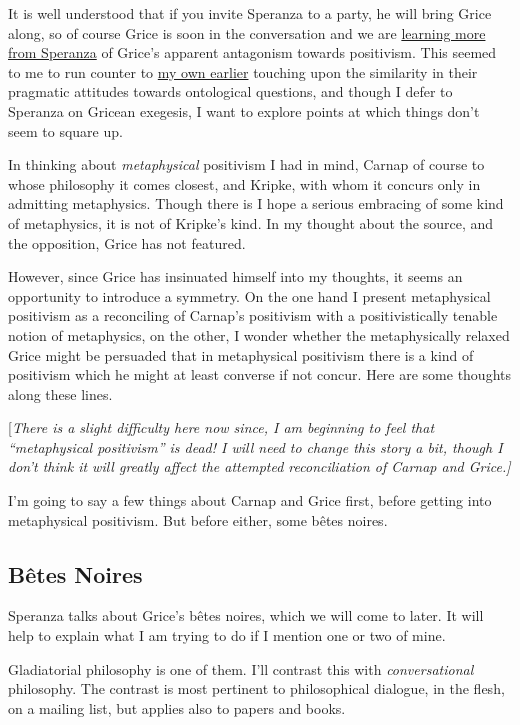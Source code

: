 \documentclass[10pt,titlepage]{book}
\begin{document}
It is well understood that if you invite Speranza to a party, he will bring Grice along, so of course Grice is soon in the conversation and we are \href{http://rbjones.com/pipermail/hist-analytic_rbjones.com/2009q2/000268.html}{learning more from Speranza} of Grice's apparent antagonism towards positivism.
This seemed to me to run counter to \href{http://rbjones.com/pipermail/hist-analytic_rbjones.com/2009q2/000254.html}{my own earlier} touching upon the similarity in their pragmatic attitudes towards ontological questions, and though I defer to Speranza on Gricean exegesis, I want to explore points at which things don't seem to square up.

In thinking about {\it metaphysical} positivism I had in mind, Carnap of course to whose philosophy it comes closest, and Kripke, with whom it concurs only in admitting metaphysics.
Though there is I hope a serious embracing of some kind of metaphysics, it is not of Kripke's kind.
In my thought about the source, and the opposition, Grice has not featured.

However, since Grice has insinuated himself into my thoughts, it seems an opportunity to introduce a symmetry.
On the one hand I present metaphysical positivism as a reconciling of Carnap's positivism with a positivistically tenable notion of metaphysics, on the other, I wonder whether the metaphysically relaxed Grice might be persuaded that in metaphysical positivism there is a kind of positivism which he might at least converse if not concur. 
Here are some thoughts along these lines.

{[\it There is a slight difficulty here now since, I am beginning to feel that ``metaphysical positivism'' is dead!
I will need to change this story a bit, though I don't think it will greatly affect the attempted reconciliation of Carnap and Grice.]}

I'm going to say a few things about Carnap and Grice first, before getting into metaphysical positivism. 
But before either, some b\^{e}tes noires.

\subsection{B\^{e}tes Noires}

Speranza talks about Grice's b\^{e}tes noires, which we will come to later.
It will help to explain what I am trying to do if I mention one or two of mine.

Gladiatorial philosophy is one of them.
I'll contrast this with {\it conversational} philosophy.
The contrast is most pertinent to philosophical dialogue, in the flesh, on a mailing list, but applies also to papers and books.
\end{document}
